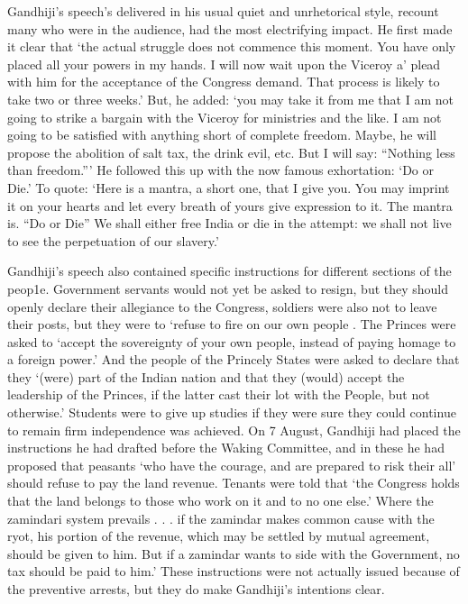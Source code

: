 Gandhiji’s speech’s delivered in his usual quiet and unrhetorical style, recount many who were in the audience, had the most electrifying impact. He first made it clear that ‘the actual struggle does not commence this moment. You have only placed all your powers in my hands. I will now wait upon the Viceroy a’ plead with him for the acceptance of the Congress demand. That process is likely to take two or three weeks.’ But, he added: ‘you may take it from me that I am not going to strike a bargain with the Viceroy for ministries and the like. I am not going to be satisfied with anything short of complete freedom. Maybe, he will propose the abolition of salt tax, the drink evil, etc. But I will say: “Nothing less than freedom.”’ He followed this up with the now famous exhortation: ‘Do or Die.’ To quote: ‘Here is a mantra, a short one, that I give you. You may imprint it on your hearts and let every breath of yours give expression to it. The mantra is. “Do or Die” We shall either free India or die in the attempt: we shall not live to see the perpetuation of our slavery.’

Gandhiji’s speech also contained specific instructions for different sections of the peop1e. Government servants would not yet be asked to resign, but they should openly declare their allegiance to the Congress, soldiers were also not to leave their posts, but they were to ‘refuse to fire on our own people . The Princes were asked to ‘accept the sovereignty of your own people, instead of paying homage to a foreign power.’ And the people of the Princely States were asked to declare that they ‘(were) part of the Indian nation and that they (would) accept the leadership of the Princes, if the latter cast their lot with the People, but not otherwise.’ Students were to give up studies if they were sure they could continue to remain firm independence was achieved. On 7 August, Gandhiji had placed the instructions he had drafted before the Waking Committee, and in these he had proposed that peasants ‘who have the courage, and are prepared to risk their all’ should refuse to pay the land revenue. Tenants were told that ‘the Congress holds that the land belongs to those who work on it and to no one else.’ Where the zamindari system prevails . . . if the zamindar makes common cause with the ryot, his portion of the revenue, which may be settled by mutual agreement, should be given to him. But if a zamindar wants to side with the Government, no tax should be paid to him.’ These instructions were not actually issued because of the preventive arrests, but they do make Gandhiji’s intentions clear.

